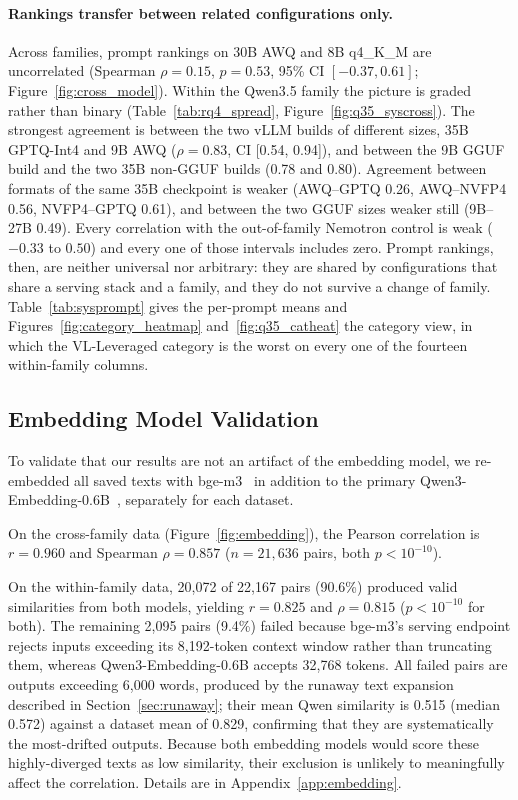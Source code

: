 \documentclass[11pt]{article}
\begin{document}
\paragraph{Rankings transfer between related configurations only.}
Across families, prompt rankings on 30B AWQ and 8B q4\_K\_M are uncorrelated
(Spearman $\rho = 0.15$, $p = 0.53$, 95\% CI $[-0.37, 0.61]$;
Figure~\ref{fig:cross_model}). Within the Qwen3.5 family the picture is
graded rather than binary (Table~\ref{tab:rq4_spread},
Figure~\ref{fig:q35_syscross}). The strongest agreement is between the two
vLLM builds of different sizes, 35B GPTQ-Int4 and 9B AWQ ($\rho = 0.83$, CI
[0.54, 0.94]), and between the 9B GGUF build and the two 35B non-GGUF builds
(0.78 and 0.80). Agreement between formats of the same 35B checkpoint is
weaker (AWQ--GPTQ 0.26, AWQ--NVFP4 0.56, NVFP4--GPTQ 0.61), and between the
two GGUF sizes weaker still (9B--27B 0.49). Every correlation with the
out-of-family Nemotron control is weak ($-0.33$ to $0.50$) and every one of
those intervals includes zero. Prompt
rankings, then, are neither universal nor arbitrary: they are shared by
configurations that share a serving stack and a family, and they do not
survive a change of family. Table~\ref{tab:sysprompt} gives the per-prompt
means and Figures~\ref{fig:category_heatmap} and~\ref{fig:q35_catheat} the
category view, in which the VL-Leveraged category is the worst on every one
of the fourteen within-family columns.


\clearpage
\subsection{Embedding Model Validation}
\label{sec:embedding}

To validate that our results are not an artifact of the embedding model, we
re-embedded all saved texts with bge-m3~\citep{chen2024bgem3} in addition to
the primary Qwen3-Embedding-0.6B~\citep{zhang2025qwen3embedding}, separately
for each dataset.

On the cross-family data (Figure~\ref{fig:embedding}), the Pearson correlation
is $r = 0.960$ and Spearman $\rho = 0.857$ ($n = 21{,}636$ pairs, both
$p < 10^{-10}$).

On the within-family data, 20{,}072 of 22{,}167 pairs (90.6\%) produced valid
similarities from both models, yielding $r = 0.825$ and $\rho = 0.815$
($p < 10^{-10}$ for both). The remaining 2{,}095 pairs (9.4\%) failed because
bge-m3's serving endpoint rejects inputs exceeding its 8{,}192-token context
window rather than truncating them, whereas Qwen3-Embedding-0.6B accepts
32{,}768 tokens. All failed pairs are outputs exceeding 6{,}000 words, produced
by the runaway text expansion described in Section~\ref{sec:runaway}; their mean
Qwen similarity is 0.515 (median 0.572) against a dataset mean of 0.829,
confirming that they are systematically the most-drifted outputs. Because both
embedding models would score these highly-diverged texts as low similarity,
their exclusion is unlikely to meaningfully affect the correlation. Details are
in Appendix~\ref{app:embedding}.
\end{document}

